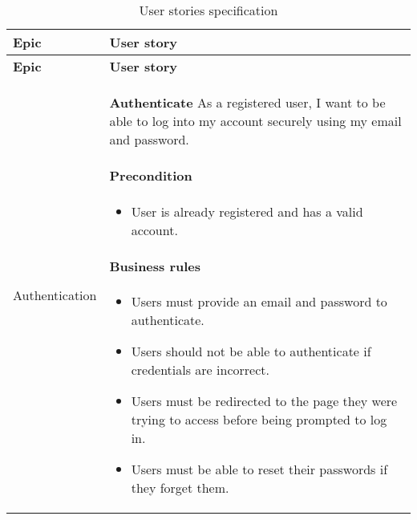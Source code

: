 \begin{longtable}{ | m{} | m{} | }
    \caption{User stories specification}                                                                                                                                                                                                                                  \\
    \hline
    \textbf{Epic}                                      & \textbf{User story}                                                                                                                                                                                              \\
    \hline
    \endfirsthead
    \hline
    \textbf{Epic}                                      & \textbf{User story}                                                                                                                                                                                              \\
    \hline
    \endhead
    \endfoot
    \endlastfoot
    Authentication                                     & \textbf{Authenticate} \newline As a registered user, I want to be able to log into my account securely using my email and password.

    \paragraph*{Precondition} \mbox{} \newline
    \begin{itemize}
        \item User is already registered and has a valid account.
    \end{itemize}

    \paragraph*{Business rules} \mbox{} \newline
    \begin{itemize}
        \item Users must provide an email and password to authenticate.
        \item Users should not be able to authenticate if credentials are incorrect.
        \item Users must be redirected to the page they were trying to access before being prompted to log in.
        \item Users must be able to reset their passwords if they forget them.
    \end{itemize}

\end{longtable}
